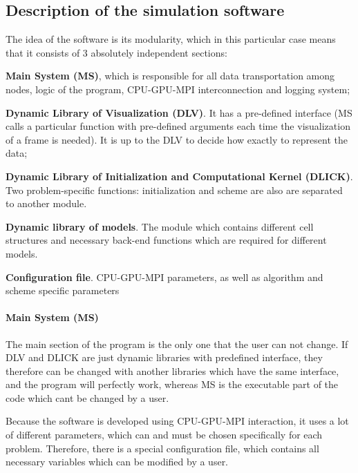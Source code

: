 \subsection*{Description of the simulation software}

The idea of the software is its modularity, which in this particular case means that it consists of 3 absolutely independent sections\+:


\begin{DoxyItemize}
\item {\bfseries Main System (MS)}, which is responsible for all data transportation among nodes, logic of the program, C\+P\+U-\/\+G\+P\+U-\/\+M\+PI interconnection and logging system;
\item {\bfseries Dynamic Library of Visualization (D\+LV)}. It has a pre-\/defined interface (MS calls a particular function with pre-\/defined arguments each time the visualization of a frame is needed). It is up to the D\+LV to decide how exactly to represent the data;
\item {\bfseries Dynamic Library of Initialization and Computational Kernel (D\+L\+I\+CK)}. Two problem-\/specific functions\+: initialization and scheme are also are separated to another module.
\item {\bfseries Dynamic library of models}. The module which contains different cell structures and necessary back-\/end functions which are required for different models.
\item {\bfseries Configuration file}. C\+P\+U-\/\+G\+P\+U-\/\+M\+PI parameters, as well as algorithm and scheme specific parameters
\end{DoxyItemize}

\paragraph*{Main System (MS)}

The main section of the program is the only one that the user can not change. If D\+LV and D\+L\+I\+CK are just dynamic libraries with predefined interface, they therefore can be changed with another libraries which have the same interface, and the program will perfectly work, whereas MS is the executable part of the code which can\textquotesingle{}t be changed by a user.

Because the software is developed using C\+P\+U-\/\+G\+P\+U-\/\+M\+PI interaction, it uses a lot of different parameters, which can and must be chosen specifically for each problem. Therefore, there is a special configuration file, which contains all necessary variables which can be modified by a user.

